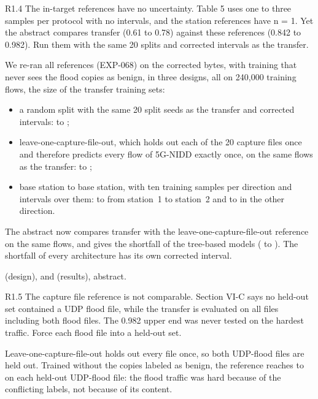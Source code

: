 \label{rv:R1.4}
\begin{concern}{R1.4}
The in-target references have no uncertainty. Table 5 uses one to three samples per protocol with no intervals, and the station references have n = 1. Yet the abstract compares transfer (0.61 to 0.78) against these references (0.842 to 0.982). Run them with the same 20 splits and corrected intervals as the transfer.
\end{concern}
\response We re-ran all references (EXP-068) on the corrected bytes, with training that never sees the flood copies as benign, in three designs, all on 240,000 training flows, the size of the transfer training sets:
\begin{itemize}[leftmargin=*, itemsep=1pt]
\item a random split with the same 20 split seeds as the transfer and corrected intervals: \RRefRandCleanmin{} to \RRefRandCleanmax{};
\item leave-one-capture-file-out, which holds out each of the 20 capture files once and therefore predicts every flow of 5G-NIDD exactly once, on the same flows as the transfer: \RRefLofoCleanmin{} to \RRefLofoCleanmax{};
\item base station to base station, with ten training samples per direction and intervals over them: \RRefSoneCleanmin{} to \RRefSoneCleanmax{} from station~1 to station~2 and \RRefStwoCleanmin{} to \RRefStwoCleanmax{} in the other direction.
\end{itemize}
The abstract now compares transfer with the leave-one-capture-file-out reference on the same flows, and gives the shortfall of the tree-based models (\RGapTreeCleanMin{} to \RGapTreeCleanMax). The shortfall of every architecture has its own corrected interval.

\action {} (design),  and  (results), abstract.

\label{rv:R1.5}
\begin{concern}{R1.5}
The capture file reference is not comparable. Section VI-C says no held-out set contained a UDP flood file, while the transfer is evaluated on all files including both flood files. The 0.982 upper end was never tested on the hardest traffic. Force each flood file into a held-out set.
\end{concern}
\response Leave-one-capture-file-out holds out every file once, so both UDP-flood files are held out. Trained without the copies labeled as benign, the reference reaches \RLofoFloodMin{} to \RLofoFloodMax{} on each held-out UDP-flood file: the flood traffic was hard because of the conflicting labels, not because of its content.

